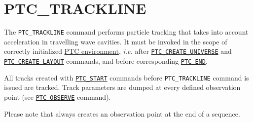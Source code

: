 \section{PTC\_TRACKLINE}
\label{sec:ptc-trackline}

The \texttt{PTC\_TRACKLINE} command performs particle tracking that takes
into account acceleration in travelling wave cavities. 
It must be invoked in the scope of correctly initialized
\hyperref[chap:ptc-setup]{PTC environment}, \textsl{i.e.} after
\hyperref[sec:ptc-create-universe]{\texttt{PTC\_CREATE\_UNIVERSE}} 
and \hyperref[sec:ptc-create-layout]{\texttt{PTC\_CREATE\_LAYOUT}} commands, and before
corresponding \hyperref[sec:ptc-end]{\texttt{PTC\_END}}. 

All tracks created with \hyperref[sec:ptc-start]{\texttt{PTC\_START}}
commands before \texttt{PTC\_TRACKLINE} command is issued are 
tracked. Track parameters are dumped at every defined observation point
(see \hyperref[sec:ptc-observe]{\texttt{PTC\_OBSERVE}} command). 

Please note that \madx always creates an observation point at the end of a
sequence.


